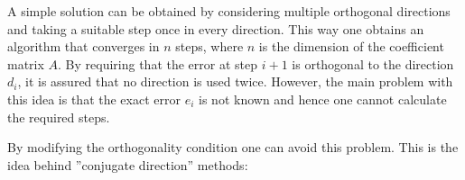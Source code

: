     A simple solution can be obtained by considering multiple orthogonal directions and taking a suitable step once in every direction. This way one obtains an algorithm that converges in $n$ steps, where $n$ is the dimension of the coefficient matrix $A$. By requiring that the error at step $i+1$ is orthogonal to the direction $d_i$, it is assured that no direction is used twice. However, the main problem with this idea is that the exact error $e_i$ is not known and hence one cannot calculate the required steps.

    By modifying the orthogonality condition one can avoid this problem. This is the idea behind ''conjugate direction'' methods:

